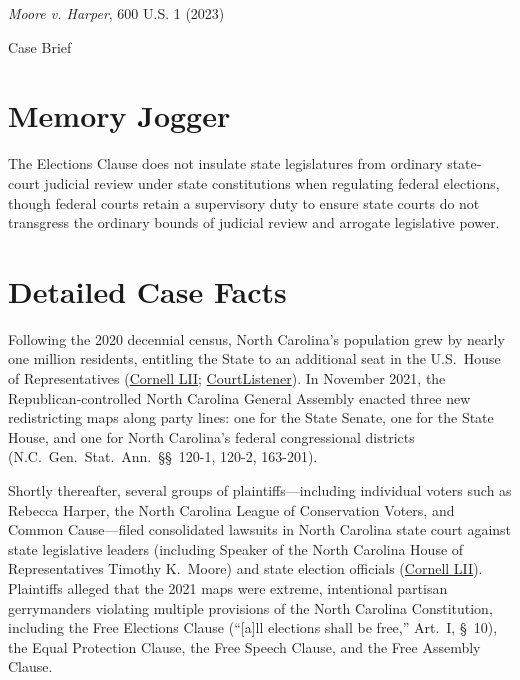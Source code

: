 \documentclass[12pt]{article}
\begin{document}
\begin{center}
{\LARGE \textit{Moore v. Harper}, 600 U.S. 1 (2023)\par}
\vspace{0.8em}
{\large Case Brief\par}
\end{center}
\vspace{1em}

\section{Memory Jogger}
The Elections Clause does not insulate state legislatures from ordinary state-court judicial review under state constitutions when regulating federal elections, though federal courts retain a supervisory duty to ensure state courts do not transgress the ordinary bounds of judicial review and arrogate legislative power.

\section{Detailed Case Facts}
Following the 2020 decennial census, North Carolina's population grew by nearly one million residents, entitling the State to an additional seat in the U.S.\ House of Representatives (\href{https://www.law.cornell.edu/supremecourt/text/21-1271}{Cornell LII}; \href{https://www.courtlistener.com/opinion/10049660/moore-v-harper/}{CourtListener}). In November 2021, the Republican-controlled North Carolina General Assembly enacted three new redistricting maps along party lines: one for the State Senate, one for the State House, and one for North Carolina's federal congressional districts (N.C.\ Gen.\ Stat.\ Ann.\ \S\S~120-1, 120-2, 163-201).

Shortly thereafter, several groups of plaintiffs---including individual voters such as Rebecca Harper, the North Carolina League of Conservation Voters, and Common Cause---filed consolidated lawsuits in North Carolina state court against state legislative leaders (including Speaker of the North Carolina House of Representatives Timothy K.\ Moore) and state election officials (\href{https://www.law.cornell.edu/supremecourt/text/21-1271}{Cornell LII}). Plaintiffs alleged that the 2021 maps were extreme, intentional partisan gerrymanders violating multiple provisions of the North Carolina Constitution, including the Free Elections Clause (``[a]ll elections shall be free,'' Art.\ I, \S~10), the Equal Protection Clause, the Free Speech Clause, and the Free Assembly Clause.
\end{document}
